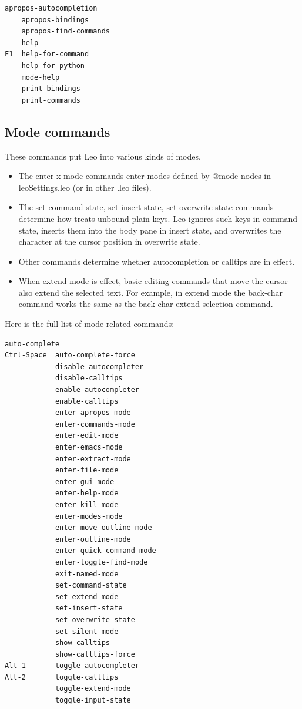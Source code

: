 \documentclass[a4paper,10pt,english]{sphinxmanual}
\begin{document}
\begin{Verbatim}[commandchars=\\\{\}]
    apropos-autocompletion
    apropos-bindings
    apropos-find-commands
    help
F1  help-for-command
    help-for-python
    mode-help
    print-bindings
    print-commands
\end{Verbatim}


\subsection{Mode commands}
\label{commands:mode-commands}
These commands put Leo into various kinds of modes.
\begin{itemize}
\item {} 
The enter-x-mode commands enter modes defined by @mode nodes in leoSettings.leo
(or in other .leo files).

\item {} 
The set-command-state, set-insert-state, set-overwrite-state commands
determine how treats unbound plain keys. Leo ignores such keys in command
state, inserts them into the body pane in insert state, and overwrites the
character at the cursor position in overwrite state.

\item {} 
Other commands determine whether autocompletion or calltips are in effect.

\item {} 
When extend mode is effect, basic editing commands that move the cursor also
extend the selected text.
For example, in extend mode the back-char command works the same as the
back-char-extend-selection command.

\end{itemize}

Here is the full list of mode-related commands:

\begin{Verbatim}[commandchars=\\\{\}]
            auto-complete
Ctrl-Space  auto-complete-force
            disable-autocompleter
            disable-calltips
            enable-autocompleter
            enable-calltips
            enter-apropos-mode
            enter-commands-mode
            enter-edit-mode
            enter-emacs-mode
            enter-extract-mode
            enter-file-mode
            enter-gui-mode
            enter-help-mode
            enter-kill-mode
            enter-modes-mode
            enter-move-outline-mode
            enter-outline-mode
            enter-quick-command-mode
            enter-toggle-find-mode
            exit-named-mode
            set-command-state
            set-extend-mode
            set-insert-state
            set-overwrite-state
            set-silent-mode
            show-calltips
            show-calltips-force
Alt-1       toggle-autocompleter
Alt-2       toggle-calltips
            toggle-extend-mode
            toggle-input-state
\end{Verbatim}
\end{document}
